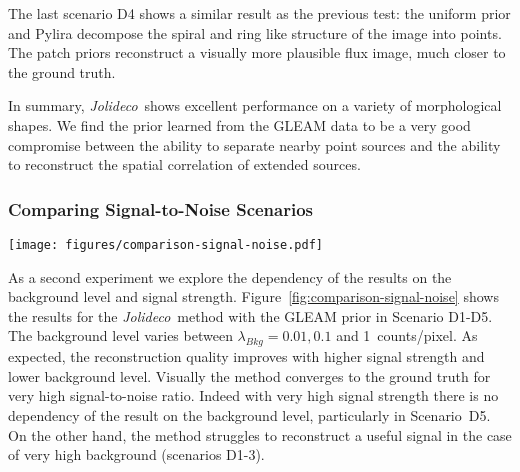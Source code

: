 \documentclass[twocolumn]{aastex631}
\newcommand{\jolideco}{\textit{Jolideco}~}
\begin{document}
    The last scenario D4 shows a similar result as the previous test: the uniform prior and Pylira decompose the spiral and ring like structure of the image into points. The patch priors reconstruct a visually more plausible flux image, much closer to the ground truth.

    In summary, \jolideco shows excellent performance on a variety of morphological shapes. We find the prior learned from the GLEAM data to be a very good compromise between the ability to separate nearby point sources and the ability to reconstruct the spatial correlation of extended sources.
    
    \subsubsection{Comparing Signal-to-Noise Scenarios}
    \begin{figure*}
        \begin{centering}
            \texttt{[image: figures/comparison-signal-noise.pdf]}
            \caption{
                Comparison of \jolideco with the GLEAM v0.1 prior for different background levels and signal strength, as represented by scenario D1-D5. The images are grouped by background level with each pair of columns showing the counts data in the left column and the reconstruction in the right column. The rows show the scenarios D1-D5 as described in Section~\ref{subsec:test-datasets}. Each pair of columns corresponds to a  background level,  \qty[mode = text]{0.001}{cts / pixel}, \qty[mode = text]{0.01}{cts / pixel} and \qty[mode = text]{0.1}{cts / pixel}. The complete results for the simulations and additional information are available at \url{https://jolideco.github.io/jolideco-comparison}.
            }
            \label{fig:comparison-signal-noise}
        \end{centering}
    \end{figure*}
    As a second experiment we explore the dependency of the results on the background level and signal strength. Figure~\ref{fig:comparison-signal-noise} shows the results for the \jolideco method with the GLEAM prior in Scenario D1-D5. The background level varies between $\lambda_{Bkg}= 0.01, 0.1$ and \qty[mode = text]{1}{counts/pixel}. As expected, the reconstruction quality improves with higher signal strength and lower background level. Visually the method converges to the ground truth for very high signal-to-noise ratio. Indeed with very high signal strength there is no dependency of the result on the background level, particularly in Scenario~D5. On the other hand, the method struggles to reconstruct a useful signal in the case of very high background (scenarios D1-3). 
\end{document}
